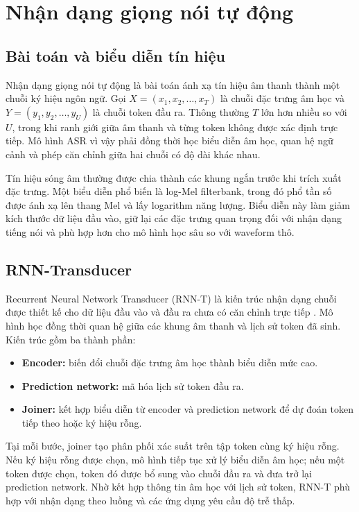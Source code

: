 \documentclass[a4paper,13pt,oneside]{report}
\begin{document}
\section{Nhận dạng giọng nói tự động}

\subsection{Bài toán và biểu diễn tín hiệu}

Nhận dạng giọng nói tự động là bài toán ánh xạ tín hiệu âm thanh thành một chuỗi ký hiệu ngôn ngữ. Gọi \(X=(x_1,x_2,\ldots,x_T)\) là chuỗi đặc trưng âm học và \(Y=(y_1,y_2,\ldots,y_U)\) là chuỗi token đầu ra. Thông thường \(T\) lớn hơn nhiều so với \(U\), trong khi ranh giới giữa âm thanh và từng token không được xác định trực tiếp. Mô hình ASR vì vậy phải đồng thời học biểu diễn âm học, quan hệ ngữ cảnh và phép căn chỉnh giữa hai chuỗi có độ dài khác nhau.

Tín hiệu sóng âm thường được chia thành các khung ngắn trước khi trích xuất đặc trưng. Một biểu diễn phổ biến là log-Mel filterbank, trong đó phổ tần số được ánh xạ lên thang Mel và lấy logarithm năng lượng. Biểu diễn này làm giảm kích thước dữ liệu đầu vào, giữ lại các đặc trưng quan trọng đối với nhận dạng tiếng nói và phù hợp hơn cho mô hình học sâu so với waveform thô.

\subsection{RNN-Transducer}

Recurrent Neural Network Transducer (RNN-T) là kiến trúc nhận dạng chuỗi được thiết kế cho dữ liệu đầu vào và đầu ra chưa có căn chỉnh trực tiếp \cite{rnnt}. Mô hình học đồng thời quan hệ giữa các khung âm thanh và lịch sử token đã sinh. Kiến trúc gồm ba thành phần:

\begin{itemize}
    \item \textbf{Encoder:} biến đổi chuỗi đặc trưng âm học thành biểu diễn mức cao.
    \item \textbf{Prediction network:} mã hóa lịch sử token đầu ra.
    \item \textbf{Joiner:} kết hợp biểu diễn từ encoder và prediction network để dự đoán token tiếp theo hoặc ký hiệu rỗng.
\end{itemize}

Tại mỗi bước, joiner tạo phân phối xác suất trên tập token cùng ký hiệu rỗng. Nếu ký hiệu rỗng được chọn, mô hình tiếp tục xử lý biểu diễn âm học; nếu một token được chọn, token đó được bổ sung vào chuỗi đầu ra và đưa trở lại prediction network. Nhờ kết hợp thông tin âm học với lịch sử token, RNN-T phù hợp với nhận dạng theo luồng và các ứng dụng yêu cầu độ trễ thấp.
\end{document}

